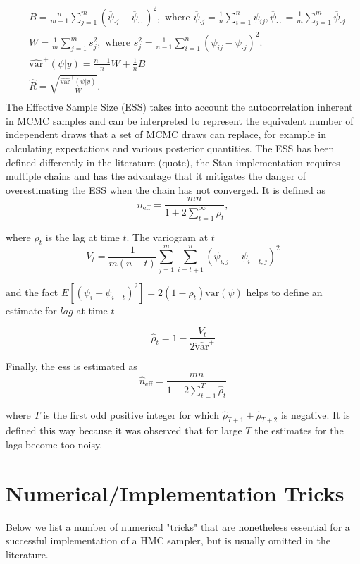 \documentclass[12pt]{report}
\begin{document}
\begin{align*}
&B = \frac{n}{m-1} \sum_{j=1}^{m}(\overline{\psi}_{\cdot j} - \overline{\psi}_{\cdot \cdot})^2, \text{ where } 
\overline{\psi}_{\cdot j} = \frac{1}{n} \sum_{i=1}^n \psi_{ij} , \overline{\psi}_{\cdot \cdot} = \frac{1}{m} \sum_{j=1}^m \overline{\psi}_{\cdot j }
 \\
&W = \frac{1}{m} \sum_{j=1}^m s_j^2 , \text{ where }
s_j^2 = \frac{1}{n-1} \sum_{i=1}^n (\psi_{ij} - \overline{\psi}_{\cdot j } )^2.\\
& \hat{\text{var}}^+(\psi|y) = \frac{n-1}{n} W + \frac{1}{n} B \\
& \hat{R} = \sqrt{\frac{\hat{\text{var}}^+(\psi|y)}{W}}. \\
\end{align*}
The Effective Sample Size (ESS) takes into account the autocorrelation inherent in MCMC samples and can be interpreted to represent the equivalent number of independent draws that a set of MCMC draws can replace, for example in calculating expectations and various posterior quantities. The ESS has been defined  differently in the literature (quote), the Stan implementation requires multiple chains and has the advantage that it mitigates the danger of overestimating the ESS when the chain has not converged. It is defined as 
\[n_{\text{eff}}  = \frac{mn}{1 + 2 \sum_{t=1}^\infty \rho_t}, \]

where  $\rho_t$ is the lag at time $t$. The variogram at $t$ 
\[V_t = \frac{1}{m(n-t)} \sum_{j=1}^m \sum_{i=t+1}^n (\psi_{i,j} - \psi_{i-t,j})^2 \]

and the fact $E[(\psi_i - \psi_{i-t})^2] = 2(1-\rho_t)\text{var}(\psi)$ helps to define an estimate for $lag$ at time $t$ 

\[\hat{\rho}_t = 1 - \frac{V_t}{2 \hat{\text{var}}^+}\]

Finally, the ess is estimated as 
\[\hat{n}_{\text{eff}} = \frac{mn}{1 + 2 \sum_{t=1}^T \hat{\rho}_t} \]

where $T$ is the first odd positive integer for which $\hat{\rho}_{T+1} + \hat{\rho}_{T+2} $ is negative. It is defined this way because it was observed that for large $T$ the estimates for the lags become too noisy. 
 
\section{Numerical/Implementation Tricks}

Below we list a number of numerical "tricks" that are nonetheless essential for a successful implementation of a HMC sampler, but is usually omitted in the literature. 
\end{document}
